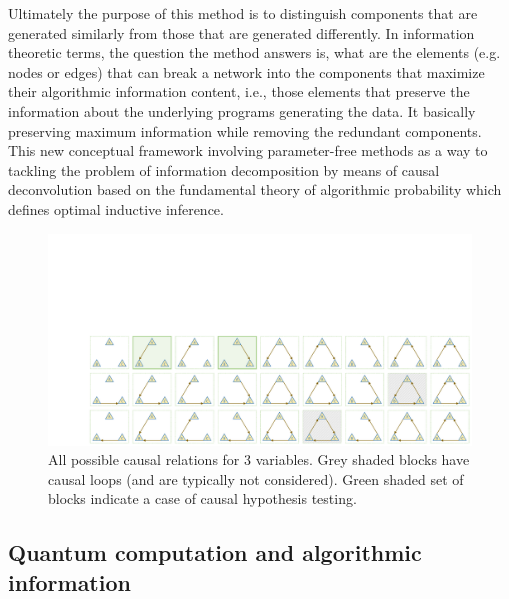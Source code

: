 \documentclass[
 aps,
 jmp,
 amsmath,amssymb,
 reprint,
]{revtex4-2}
\begin{document}
Ultimately the purpose of this method is to distinguish components that are generated similarly from those that are generated differently. 
In information theoretic terms, the question the method answers is, what are the elements (e.g. nodes or edges) that can break a network into the components that maximize their algorithmic information content, i.e., those elements that preserve the information about the underlying programs generating the data.
It basically preserving maximum information while removing the redundant components. 
This new conceptual framework involving parameter-free methods as a way to tackling the problem of information decomposition by means of causal deconvolution based on the fundamental theory of algorithmic probability which defines optimal inductive inference.

\begin{figure}[t!]
	\centering %
	\includegraphics[clip, trim=3cm 0cm 0cm 9cm,width=\textwidth]{plot/3vci.pdf}
	\caption{All possible causal relations for 3 variables. Grey shaded blocks have causal loops (and are typically not considered). Green shaded set of blocks indicate a case of causal hypothesis testing.}
	\label{fig:3vci}
\end{figure}

\subsection{Quantum computation and algorithmic information}
\end{document}
